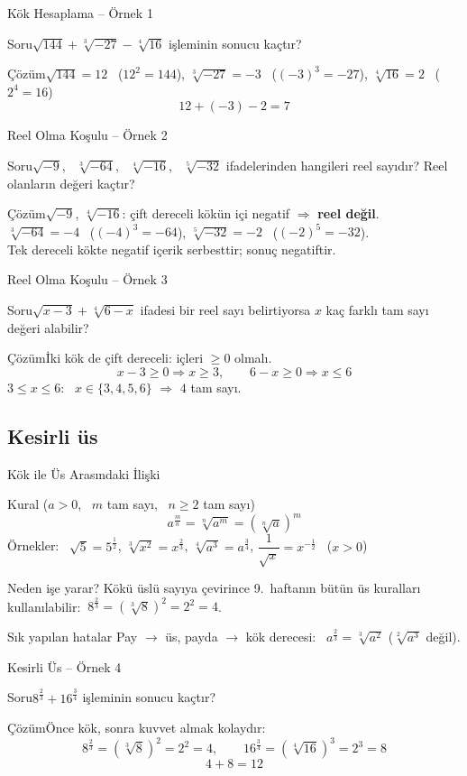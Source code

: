 \documentclass[aspectratio=169,11pt]{beamer}
\newcommand{\soru}[3]{%
\begin{frame}{#1}
  \begin{block}{Soru}\large #2\end{block}
  \pause
  \begin{exampleblock}{Çözüm}\large #3\end{exampleblock}
\end{frame}}
\begin{document}
\soru{Kök Hesaplama -- Örnek 1}
{\(\sqrt{144}+\sqrt[3]{-27}-\sqrt[4]{16}\) işleminin sonucu kaçtır?}
{\(\sqrt{144}=12\) \ (\(12^2=144\)), \quad \(\sqrt[3]{-27}=-3\) \ (\((-3)^3=-27\)), \quad \(\sqrt[4]{16}=2\) \ (\(2^4=16\))
\[12+(-3)-2=7\]}

\soru{Reel Olma Koşulu -- Örnek 2}
{\(\sqrt{-9}\), \ \(\sqrt[3]{-64}\), \ \(\sqrt[4]{-16}\), \ \(\sqrt[5]{-32}\) ifadelerinden hangileri reel sayıdır? Reel olanların değeri kaçtır?}
{\(\sqrt{-9}\), \(\sqrt[4]{-16}\): çift dereceli kökün içi negatif \(\Rightarrow\) \textbf{reel değil}.\\[3pt]
\(\sqrt[3]{-64}=-4\) \ (\((-4)^3=-64\)), \quad \(\sqrt[5]{-32}=-2\) \ (\((-2)^5=-32\)).\\[3pt]
Tek dereceli kökte negatif içerik serbesttir; sonuç negatiftir.}

\soru{Reel Olma Koşulu -- Örnek 3}
{\(\sqrt{x-3}+\sqrt[4]{6-x}\) ifadesi bir reel sayı belirtiyorsa \(x\) kaç farklı tam sayı değeri alabilir?}
{İki kök de çift dereceli: içleri \(\ge 0\) olmalı.
\[x-3\ge 0\Rightarrow x\ge 3,\qquad 6-x\ge 0\Rightarrow x\le 6\]
\(3\le x\le 6\): \ \(x\in\{3,4,5,6\}\) \(\Rightarrow\) \(4\) tam sayı.}

\subsection{Kesirli üs}
\begin{frame}{Kök ile Üs Arasındaki İlişki}
\begin{block}{Kural (\(a>0\), \ \(m\) tam sayı, \ \(n\ge 2\) tam sayı)}
\[a^{\frac{m}{n}}=\sqrt[n]{a^m}=\left(\sqrt[n]{a}\right)^m\]
Örnekler: \ \(\sqrt{5}=5^{\frac12}\), \quad \(\sqrt[3]{x^2}=x^{\frac23}\), \quad \(\sqrt[4]{a^3}=a^{\frac34}\), \quad \(\dfrac{1}{\sqrt{x}}=x^{-\frac12}\) \ (\(x>0\))
\end{block}
\begin{block}{Neden işe yarar?}
Kökü üslü sayıya çevirince 9.~haftanın bütün üs kuralları kullanılabilir:
\(\ 8^{\frac23}=\left(\sqrt[3]{8}\right)^2=2^2=4\).
\end{block}
\begin{alertblock}{Sık yapılan hatalar}
Pay \(\to\) üs, payda \(\to\) kök derecesi: \ \(a^{\frac{2}{3}}=\sqrt[3]{a^2}\) (\(\sqrt[2]{a^3}\) değil).
\end{alertblock}
\end{frame}

\soru{Kesirli Üs -- Örnek 4}
{\(8^{\frac23}+16^{\frac34}\) işleminin sonucu kaçtır?}
{Önce kök, sonra kuvvet almak kolaydır:
\[8^{\frac23}=\left(\sqrt[3]{8}\right)^2=2^2=4,\qquad 16^{\frac34}=\left(\sqrt[4]{16}\right)^3=2^3=8\]
\[4+8=12\]}
\end{document}
